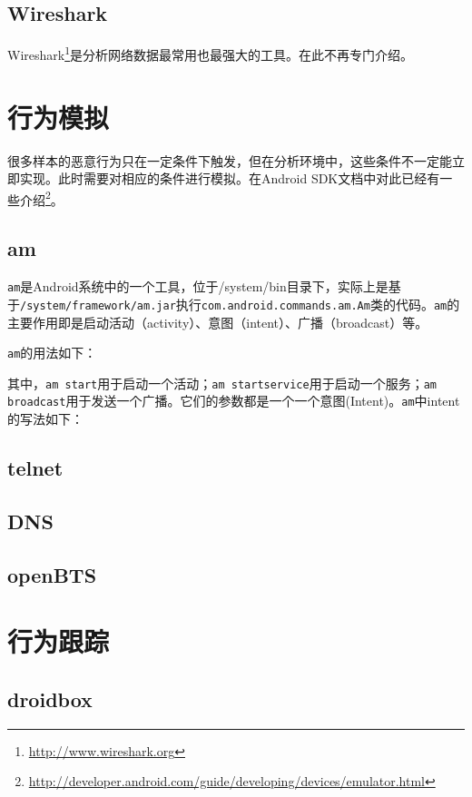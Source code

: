 \subsection{Wireshark}
Wireshark\footnote{\url{http://www.wireshark.org}}是分析网络数据最常用也最强大的工具。在此不再专门介绍。

\section{行为模拟}
很多样本的恶意行为只在一定条件下触发，但在分析环境中，这些条件不一定能立即实现。此时需要对相应的条件进行模拟。在Android SDK文档中对此已经有一些介绍\footnote{\url{http://developer.android.com/guide/developing/devices/emulator.html}}。

\subsection{am}
\lstinline!am!是Android系统中的一个工具，位于/system/bin目录下，实际上是基于\lstinline!/system/framework/am.jar!执行\lstinline!com.android.commands.am.Am!类的代码。\lstinline!am!的主要作用即是启动活动（activity）、意图（intent）、广播（broadcast）等。

\lstinline!am!的用法如下：


其中，\lstinline!am start!用于启动一个活动；\lstinline!am startservice!用于启动一个服务；\lstinline!am broadcast!用于发送一个广播。它们的参数都是一个一个意图(Intent)。\lstinline!am!中intent的写法如下：


\subsection{telnet}

\subsection{DNS}

\subsection{openBTS}

\section{行为跟踪}
\subsection{droidbox}
